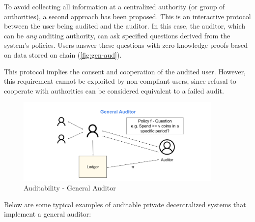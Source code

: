 To avoid collecting all information at a centralized authority (or group of authorities), a second approach has been proposed. This is an interactive protocol between the user being audited and the auditor. In this case, the auditor, which can be \textit{any} auditing authority, can ask specified questions derived from the system's policies. Users answer these questions with zero-knowledge proofs based on data stored on chain (\autoref{fig:gen-aud}).

This protocol implies the consent and cooperation of the audited user. However, this requirement cannot be exploited by non-compliant users, since refusal to cooperate with authorities can be considered equivalent to a failed audit.

\begin{figure}
    \centering
    \includegraphics[width=0.9\textwidth]{images/privacy/Auditability in blockchain - General Auditor.png}
    \caption{Auditability - General Auditor}
    \label{fig:gen-aud}
\end{figure}

Below are some typical examples of auditable private decentralized systems that implement a general auditor:

% 
